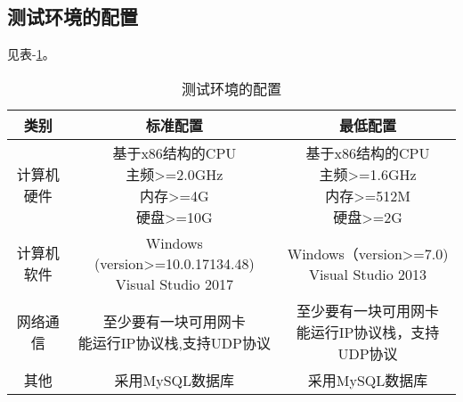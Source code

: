 \subsection{测试环境的配置}
见表-\ref{tab:test-environment}。
\begin{table}[htbp]
\centering
\caption{测试环境的配置} \label{tab:test-environment}
\begin{tabular}{|c|c|c|}
    \hline
    类别 & 标准配置 & 最低配置 \\
    \hline
    计算机硬件 & \tabincell{c}{基于x86结构的CPU\\ 主频>=2.0GHz\\ 内存>=4G\\ 硬盘>=10G} & \tabincell{c}{基于x86结构的CPU\\ 主频>=1.6GHz\\ 内存>=512M\\ 硬盘>=2G} \\
    \hline
    计算机软件 & \tabincell{c}{Windows (version>=10.0.17134.48)\\ Visual Studio 2017} & \tabincell{c}{Windows（version>=7.0)\\     Visual Studio 2013} \\
    \hline
    网络通信 & \tabincell{c}{至少要有一块可用网卡\\ 能运行IP协议栈,支持UDP协议} & \tabincell{c}{至少要有一块可用网卡\\ 能运行IP协议栈，支持UDP协议} \\
    \hline
    其他 & 采用MySQL数据库 & 采用MySQL数据库 \\
    \hline

\end{tabular}
\end{table}

